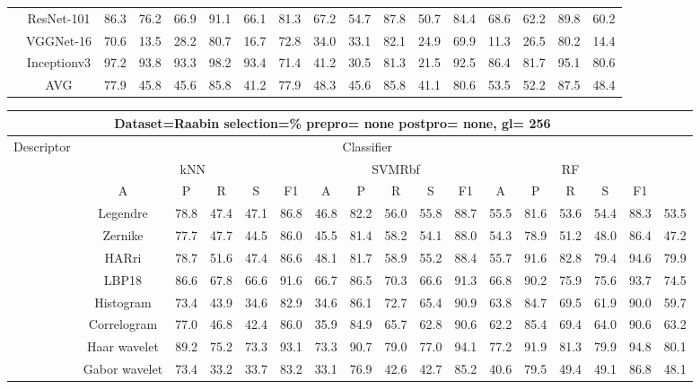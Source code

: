 \documentclass[12pt,italian]{article}
\begin{document}
\begin{tiny}
\begin{longtable}{lcccccccccccccccc}
& ResNet-101 & 86.3 & 76.2 & 66.9 & 91.1 & 66.1 & 81.3 & 67.2 & 54.7 & 87.8 & 50.7 & 84.4 & 68.6 & 62.2 & 89.8 & 60.2 \\ 
& VGGNet-16 & 70.6 & 13.5 & 28.2 & 80.7 & 16.7 & 72.8 & 34.0 & 33.1 & 82.1 & 24.9 & 69.9 & 11.3 & 26.5 & 80.2 & 14.4 \\ 
& Inceptionv3 & 97.2 & 93.8 & 93.3 & 98.2 & 93.4 & 71.4 & 41.2 & 30.5 & 81.3 & 21.5 & 92.5 & 86.4 & 81.7 & 95.1 & 80.6 \\ 
\hline
& AVG & 77.9 & 45.8 & 45.6 & 85.8 & 41.2 & 77.9 & 48.3 & 45.6 & 85.8 & 41.1 & 80.6 & 53.5 & 52.2 & 87.5 & 48.4 \\ 
\hline
\bottomrule
\end{longtable} 

 \pagebreak 
\begin{longtable}{lcccccccccccccccc}
\toprule
\multicolumn{16}{c}{Dataset=Raabin selection=\% prepro= none postpro= none, gl= 256} \\ 
\toprule
Descriptor & \multicolumn{15}{c}{Classifier} \\ 
& \multicolumn{5}{c}{kNN} & \multicolumn{5}{c}{SVMRbf} & \multicolumn{5}{c}{RF} \\ 
& A & P & R & S & F1 & A & P & R & S & F1 & A & P & R & S & F1 \\ 
\midrule
& Legendre & 78.8 & 47.4 & 47.1 & 86.8 & 46.8 & 82.2 & 56.0 & 55.8 & 88.7 & 55.5 & 81.6 & 53.6 & 54.4 & 88.3 & 53.5 \\ 
& Zernike & 77.7 & 47.7 & 44.5 & 86.0 & 45.5 & 81.4 & 58.2 & 54.1 & 88.0 & 54.3 & 78.9 & 51.2 & 48.0 & 86.4 & 47.2 \\ 
& HARri & 78.7 & 51.6 & 47.4 & 86.6 & 48.1 & 81.7 & 58.9 & 55.2 & 88.4 & 55.7 & 91.6 & 82.8 & 79.4 & 94.6 & 79.9 \\ 
& LBP18 & 86.6 & 67.8 & 66.6 & 91.6 & 66.7 & 86.5 & 70.3 & 66.6 & 91.3 & 66.8 & 90.2 & 75.9 & 75.6 & 93.7 & 74.5 \\ 
& Histogram & 73.4 & 43.9 & 34.6 & 82.9 & 34.6 & 86.1 & 72.7 & 65.4 & 90.9 & 63.8 & 84.7 & 69.5 & 61.9 & 90.0 & 59.7 \\ 
& Correlogram & 77.0 & 46.8 & 42.4 & 86.0 & 35.9 & 84.9 & 65.7 & 62.8 & 90.6 & 62.2 & 85.4 & 69.4 & 64.0 & 90.6 & 63.2 \\ 
& Haar wavelet & 89.2 & 75.2 & 73.3 & 93.1 & 73.3 & 90.7 & 79.0 & 77.0 & 94.1 & 77.2 & 91.9 & 81.3 & 79.9 & 94.8 & 80.1 \\ 
& Gabor wavelet & 73.4 & 33.2 & 33.7 & 83.2 & 33.1 & 76.9 & 42.6 & 42.7 & 85.2 & 40.6 & 79.5 & 49.4 & 49.1 & 86.8 & 48.1 \\ 

\end{longtable}
\end{tiny}
\end{document}
